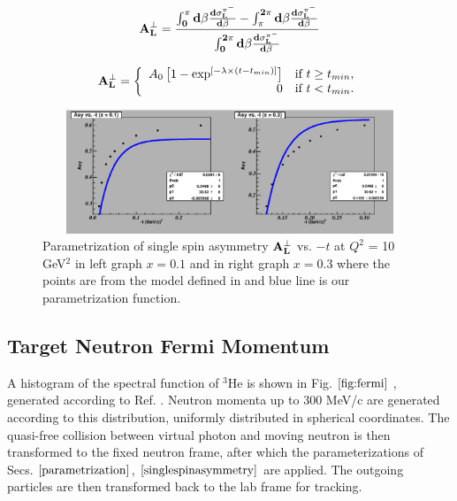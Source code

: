 \begin{equation}
  \bf{A_{L}^{\perp}} = \frac{\int^{\pi}_{0}d\beta\frac{d\sigma_{L}^{\pi^{-}}}{d\beta} - \int^{2\pi}_{\pi}d\beta\frac{d\sigma_{L}^{\pi^{-}}}{d\beta} } 
       {\int^{2\pi}_{0}d\beta\frac{d\sigma_{L}^{\pi^{-}}}{d\beta}}         
     \label{equation:ssa}
\end{equation}

\begin{equation}
        \bf{A_{L}^{\perp}} = \left\{
        \begin{array}{rl}
        A_{0} \left[ 1 - \exp^{ [ -\lambda \times ( t - t_{min} ) ] } \right] & \text{if } t \ge t_{min}, \\
        0 &  \text{if } t < t_{min}.
        \end{array} \right.
     \label{equation:asy-fit}
\end{equation}

\begin{figure}[!hbt]
    \centering
    \includegraphics[width=6.0in,height=1.45in]{./figures/asym_3.pdf}
    \caption{ Parametrization of single spin asymmetry $\bf{A_{L}^{\perp}}$ vs. $-t$ at $Q^2$ = 10 GeV$^2$ in 
    left graph $x = 0.1$ and in right  graph $x = 0.3$ where the points are from the model defined in \cite{frankfurt} 
    and blue line is our parametrization function.}
    \label{fig:asym-1}
\end{figure}

\subsection{ Target Neutron Fermi Momentum }
\label{fermimotion}
A histogram of the spectral function of $^3$He is shown in Fig. $\ref{fig:fermi}$ , generated according to Ref. 
\cite{fermipaper}. Neutron momenta up to 300 MeV/c are generated according to this distribution, uniformly distributed in 
spherical coordinates. The quasi-free collision between virtual photon and moving neutron is then transformed to the 
fixed neutron frame, after which the parameterizations of Secs. $\ref{parametrization}$, $\ref{singlespinasymmetry}$ are 
applied. The outgoing particles are then transformed back to the lab frame for tracking.

